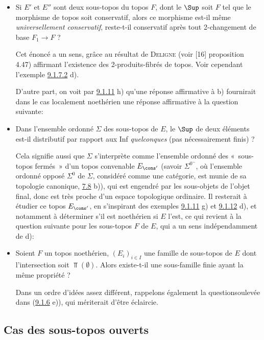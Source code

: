 \documentclass[10pt]{../fichiers-configuration-latex/smfart}
\begin{document}
\begin{itemize}
\item[c)] Si $E'$ et $E''$ sont deux sous-topos du topos $F$, dont le
$\Sup$ soit $F$ \ie tel que le morphisme de topos  soit
conservatif, alors ce morphisme est-il même \emph{universellement
conservatif}, \ie reste-t-il conservatif après tout 2-changement de
base $F_1\rightarrow F$ ?

Cet énoncé a un sens, grâce au résultat de \textsc{Deligne} (voir [16] proposition 4.47)
affirmant l'existence des 2-produits-fibrés de topos. Voir cependant
l'exemple \hyperref[IV.exer9.1.7.2]{9.1.7.2} d).

D'autre part, on voit par \hyperref[IV.exer9.1.11]{9.1.11} h) qu'une réponse
affirmative à b) fournirait dans le cas localement noethérien une
réponse affirmative à la question suivante:

\item[d)] Dans l'ensemble ordonné $\Sigma$ des sous-topos de $E$, le
$\Sup$ de deux éléments est-il distributif par rapport aux Inf
\emph{quelconques} (pas nécessairement finis) ?

Cela signifie aussi que $\Sigma$ s'interprète comme l'ensemble
ordonné des « sous-topos fermés »  d'un topos convenable
$E_{\cons'}$ (savoir $\Sigma^{0^{\sim}}$, où l'ensemble ordonné
opposé $\Sigma^0$ de $\Sigma$, considéré comme une
catégorie, est
munie de sa topologie canonique, \cf \hyperref[IV.exer7.8]{7.8} b)), qui est
engendré par les sous-objets de l'objet final, donc est très proche
d'un espace topologique ordinaire. Il resterait à étudier ce topos
$E_{\cons'}$, en s'inspirant des exemples \hyperref[IV.exer9.1.11]{9.1.11} g) et
\hyperref[IV.exer9.1.12]{9.1.12} d), et notamment à déterminer s'il est
noethérien si $E$ l'est, ce qui revient à la question suivante pour
les sous-topos $F$ de $E$, qui a un sens indépendamment de d):

\item[e)] Soient $F$ un topos noethérien, $(E_i)_{i\in I}$ une famille
de sous-topos de $E$ dont l'intersection soit $\Top(∅)$. Alors
existe-t-il une sous-famille finie ayant la même propriété ?

Dans un ordre d'idées assez différent, rappelons également la
question\pageoriginale soulevée dans (\hyperref[IV.exer9.1.6]{9.1.6} e)), qui
mériterait d'être éclaircie.
\end{itemize}

\subsection{Cas des sous-topos ouverts}
\end{document}
